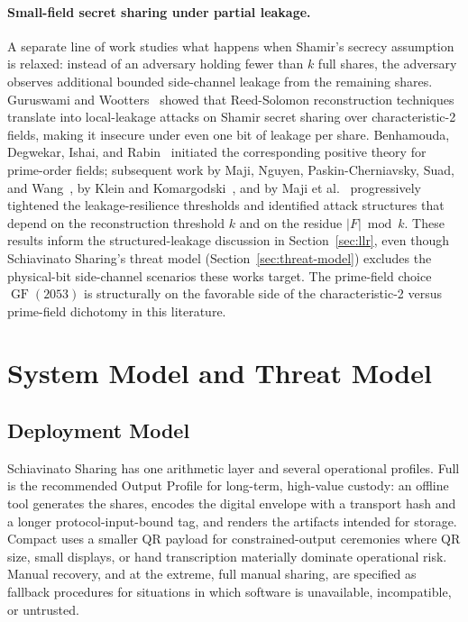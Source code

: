 \documentclass[11pt]{article}
\newcommand{\GF}{\operatorname{GF}}
\begin{document}
\paragraph{Small-field secret sharing under partial leakage.} A separate line of work studies what happens when Shamir's secrecy assumption is relaxed: instead of an adversary holding fewer than $k$ full shares, the adversary observes additional bounded side-channel leakage from the remaining shares. Guruswami and Wootters~\cite{guruswamiwootters2016} showed that Reed-Solomon reconstruction techniques translate into local-leakage attacks on Shamir secret sharing over characteristic-2 fields, making it insecure under even one bit of leakage per share. Benhamouda, Degwekar, Ishai, and Rabin~\cite{benhamouda2018} initiated the corresponding positive theory for prime-order fields; subsequent work by Maji, Nguyen, Paskin-Cherniavsky, Suad, and Wang~\cite{maji2021}, by Klein and Komargodski~\cite{klein2023}, and by Maji et al.~\cite{maji2025} progressively tightened the leakage-resilience thresholds and identified attack structures that depend on the reconstruction threshold $k$ and on the residue $|F| \bmod k$. These results inform the structured-leakage discussion in Section~\ref{sec:llr}, even though Schiavinato Sharing's threat model (Section~\ref{sec:threat-model}) excludes the physical-bit side-channel scenarios these works target. The prime-field choice $\GF(2053)$ is structurally on the favorable side of the characteristic-2 versus prime-field dichotomy in this literature.

\section{System Model and Threat Model}
\label{sec:system-model}

\subsection{Deployment Model}

Schiavinato Sharing has one arithmetic layer and several operational profiles. Full is the recommended Output Profile for long-term, high-value custody: an offline tool generates the shares, encodes the digital envelope with a transport hash and a longer protocol-input-bound tag, and renders the artifacts intended for storage. Compact uses a smaller QR payload for constrained-output ceremonies where QR size, small displays, or hand transcription materially dominate operational risk. Manual recovery, and at the extreme, full manual sharing, are specified as fallback procedures for situations in which software is unavailable, incompatible, or untrusted.
\end{document}
